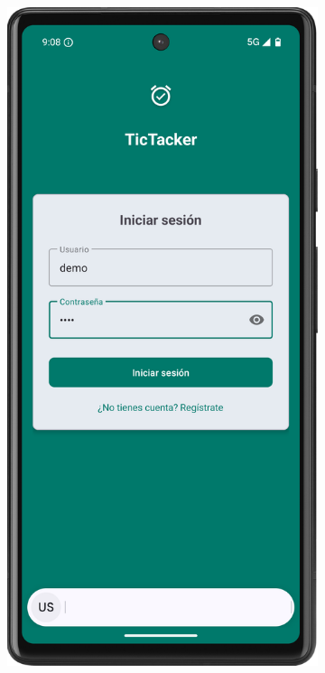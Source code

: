\begin{figure}[H]
     \centering
     \begin{subfigure}[b]{0.3\textwidth}
         \centering
         \includegraphics[width=\textwidth]{root/login.png}

\end{subfigure}
\end{figure}
